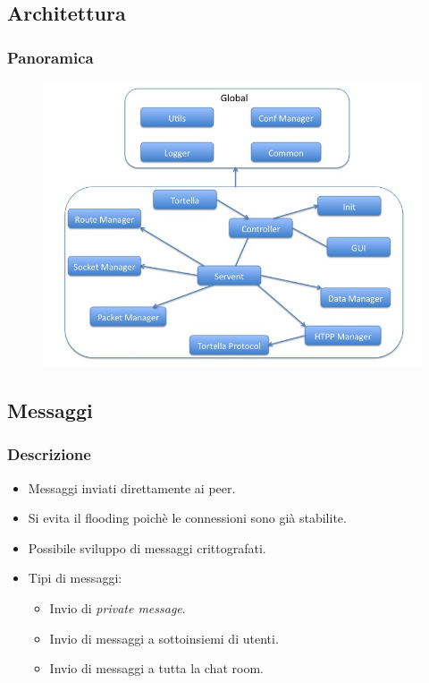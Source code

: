 \documentclass[a4paper,italian,12pt]{beamer}
\begin{document}
		\subsection{Architettura}
			\begin{frame}
				\frametitle{Panoramica}
				\begin{figure}[H]
					\begin{center}
						\includegraphics[scale=0.3]{etc/architectural_overview.png}
					\end{center}
				\end{figure}
			\end{frame}
				
		\subsection{Messaggi}
			\begin{frame}
				\frametitle{Descrizione}
				\begin{itemize}
					\item Messaggi inviati direttamente ai peer.
					\item Si evita il flooding poichè le connessioni sono già stabilite.
					\item Possibile sviluppo di messaggi crittografati.
					\item Tipi di messaggi:
					\begin{itemize}
						\item Invio di \textit{private message}.
						\item Invio di messaggi a sottoinsiemi di utenti.
						\item Invio di messaggi a tutta la chat room.
					\end{itemize}
				\end{itemize}
			\end{frame}
			
\end{document}
